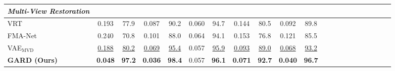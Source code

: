 \begin{table}[h]
{\begin{tabular}{lccccc ccccc ccccc ccccc}
\midrule

\textit{Multi-View Restoration} \\
\midrule

VRT~\cite{liang2024vrt}
& 0.193  &   77.9
& 0.087  &   90.2
& 0.060  &   94.7
& 0.144  &   80.5
& 0.092  &   89.8
\\

FMA-Net~\cite{Youk_2024_CVPR}
& 0.240 &    70.8
& 0.101 &    88.0
& 0.064 &    94.1
& 0.153 &    76.8
& 0.121 &    85.5
\\



VAE$_\text{MVD}$
& \underline{0.188} & \underline{80.2}
& \underline{0.069} & \underline{95.4}
& {0.057} & \underline{95.9}
& \underline{0.093} & \underline{89.0}
& \underline{0.068} & \underline{93.2} \\


\textbf{GARD (Ours)}
& \textbf{0.048} & \textbf{97.2}
& \textbf{0.036} & \textbf{98.4}
& {0.057} & \textbf{96.1}
& \textbf{0.071} & \textbf{92.7}
& \textbf{0.040} & \textbf{96.7}  \\


\bottomrule
\end{tabular}
}
\end{table}


